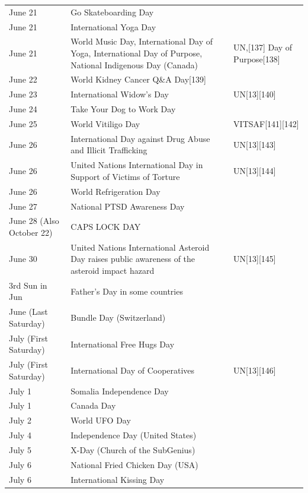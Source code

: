 \documentclass[
  openany]{book}
\begin{document}
\begin{longtable}[t]{>{\raggedright\arraybackslash}p{8em}>{\raggedright\arraybackslash}p{20em}>{\raggedright\arraybackslash}p{12em}}
\rowcolor{gray!6}  June 21 & Go Skateboarding Day & \\
June 21 & International Yoga Day & \\
\rowcolor{gray!6}  June 21 & World Music Day, International Day of Yoga, International Day of Purpose, National Indigenous Day (Canada) & UN,[137] Day of Purpose[138]\\
\addlinespace
June 22 & World Kidney Cancer Q\&A Day[139] & \\
\rowcolor{gray!6}  June 23 & International Widow's Day & UN[13][140]\\
June 24 & Take Your Dog to Work Day & \\
\rowcolor{gray!6}  June 25 & World Vitiligo Day & VITSAF[141][142]\\
June 26 & International Day against Drug Abuse and Illicit Trafficking & UN[13][143]\\
\addlinespace
\rowcolor{gray!6}  June 26 & United Nations International Day in Support of Victims of Torture & UN[13][144]\\
June 26 & World Refrigeration Day & \\
\rowcolor{gray!6}  June 27 & National PTSD Awareness Day & \\
June 28 (Also October 22) & CAPS LOCK DAY & \\
\rowcolor{gray!6}  June 30 & United Nations International Asteroid Day raises public awareness of the asteroid impact hazard & UN[13][145]\\
\addlinespace
3rd Sun in Jun & Father's Day in some countries & \\
\rowcolor{gray!6}  June (Last Saturday) & Bundle Day (Switzerland) & \\
July (First Saturday) & International Free Hugs Day & \\
\rowcolor{gray!6}  July (First Saturday) & International Day of Cooperatives & UN[13][146]\\
July 1 & Somalia Independence Day & \\
\addlinespace
\rowcolor{gray!6}  July 1 & Canada Day & \\
July 2 & World UFO Day & \\
\rowcolor{gray!6}  July 4 & Independence Day (United States) & \\
July 5 & X-Day (Church of the SubGenius) & \\
\rowcolor{gray!6}  July 6 & National Fried Chicken Day (USA) & \\
\addlinespace
July 6 & International Kissing Day & [147]\\

\end{longtable}
\end{document}
